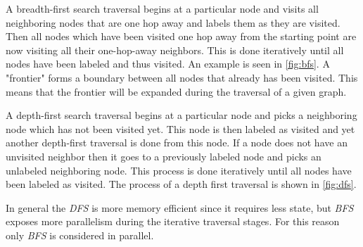 A breadth-first search traversal begins at a particular node and visits all neighboring nodes that are one hop away and labels them as they are visited. 
Then all nodes which have been visited one hop away from the starting point are now visiting all their one-hop-away neighbors. 
This is done iteratively until all nodes have been labeled and thus visited.
An example is seen in \autoref{fig:bfs}.
A "frontier" forms a boundary between all nodes that already has been visited.
This means that the frontier will be expanded during the traversal of a given graph.

A depth-first search traversal begins at a particular node and picks a neighboring node which has not been visited yet. 
This node is then labeled as visited and yet another depth-first traversal is done from this node. 
If a node does not have an unvisited neighbor then it goes to a previously labeled node and picks an unlabeled neighboring node. 
This process is done iteratively until all nodes have been labeled as visited.
The process of a depth first traversal is shown in \autoref{fig:dfs}.

In general the \textit{DFS} is more memory efficient since it requires less state, but \textit{BFS} exposes more parallelism during the iterative traversal stages.
For this reason only \textit{BFS} is considered in parallel.

